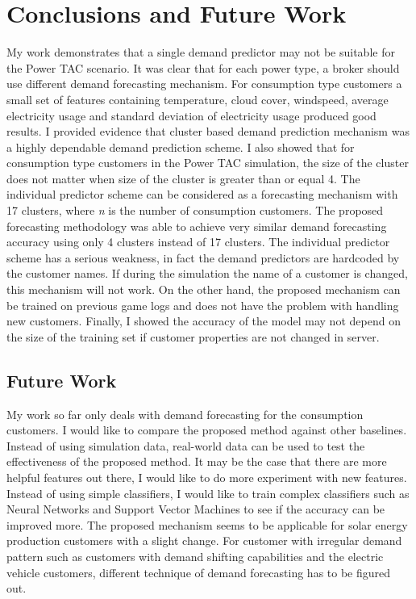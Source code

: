 
\chapter{Conclusions and Future Work}

My work demonstrates that a single demand predictor may not be suitable for the Power TAC scenario. It was clear that for each power type, a broker should use different demand forecasting mechanism. For consumption type customers a small set of features containing temperature, cloud cover, windspeed, average electricity usage and standard deviation of electricity usage produced good results. I provided evidence that cluster based demand prediction mechanism was a highly dependable demand prediction scheme. I also showed that for consumption type customers in the Power TAC simulation, the size of the cluster does not matter when size of the cluster is greater than or equal 4. The individual predictor scheme can be considered as a forecasting mechanism with 17 clusters, where \textit{n} is the number of consumption customers. The proposed forecasting methodology was able to achieve very similar demand forecasting accuracy using only 4 clusters instead of 17 clusters. The individual predictor scheme has a serious weakness, in fact the demand predictors are hardcoded by the customer names. If during the simulation the name of a customer is changed, this mechanism will not work. On the other hand, the proposed mechanism can be trained on previous game logs and does not have the problem with handling new customers. Finally, I showed the accuracy of the model may not depend on the size of the training set if customer properties are not changed in server.

\section{Future Work}

My work so far only deals with demand forecasting for the consumption customers. I would like to compare the proposed method against other baselines. Instead of using simulation data, real-world data can be used to test the effectiveness of the proposed method. It may be the case that there are more helpful features out there, I would like to do more experiment with new features. Instead of using simple classifiers, I would like to train complex classifiers such as Neural Networks \cite{witten2005data} and Support Vector Machines \cite{witten2005data} to see if the accuracy can be improved more.  The proposed mechanism seems to be applicable for solar energy production customers with a slight change. For customer with irregular demand pattern such as customers with demand shifting capabilities and the electric vehicle customers, different technique of demand forecasting has to be figured out. 
